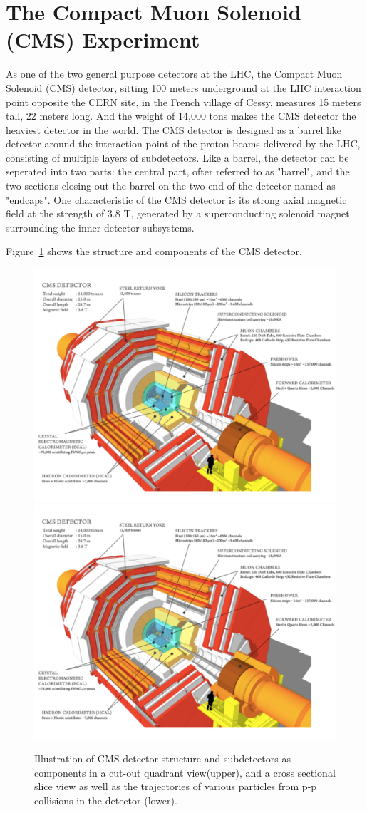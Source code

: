 \section{The Compact Muon Solenoid (CMS) Experiment}
As one of the two general purpose detectors at the LHC, the Compact Muon Solenoid (CMS) detector\cite{lhc_cmsatcern}, sitting 100 meters underground at the LHC interaction point opposite the CERN site, in the French village of Cessy, measures 15 meters tall, 22 meters long. And the weight of 14,000 tons makes the CMS detector the heaviest detector in the world. The CMS detector is designed as a barrel like detector around the interaction point of the proton beams delivered by the LHC, consisting of multiple layers of subdetectors. Like a barrel, the detector can be seperated into two parts: the central part, ofter referred to as "barrel", and the two sections closing out the barrel on the two end of the detector named as "endcaps". One characteristic of the CMS detector is its strong axial magnetic field at the strength of 3.8 T, generated by a superconducting solenoid magnet surrounding the inner detector subsystems.

Figure~\ref{fig:lhc_cmsstructure} shows the structure and components of the CMS detector.
\begin{figure}[htbp]
\begin{center}
\includegraphics[width=0.7\linewidth, page=1]{figures/lhc_cmsstructure.pdf}
\includegraphics[width=0.7\linewidth, page=2]{figures/lhc_cmsstructure.pdf}
\caption{Illustration of CMS detector structure and subdetectors as components in a cut-out quadrant view(upper), and a cross sectional slice view as well as the trajectories of various particles from p-p collisions in the detector (lower).}
\label{fig:lhc_cmsstructure}
\end{center}
\end{figure}

